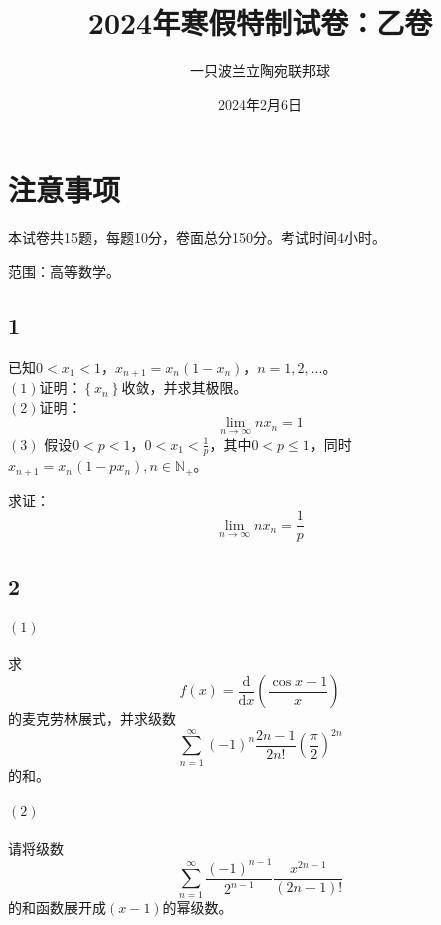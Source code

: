 \documentclass[a4paper,12pt]{article}
\title{2024年寒假特制试卷：乙卷}
\author{一只波兰立陶宛联邦球}
\date{2024年2月6日}
\begin{document}
\maketitle
\section*{注意事项}
本试卷共15题，每题10分，卷面总分150分。考试时间4小时。

范围：高等数学。
\subsection*{1}\noindent 已知$0<x_{1}<1$，$x_{n+1}=x_{n}\left(1-x_{n}\right)$，$n=1,2,\dots$。\\
\noindent $\left(1\right)$证明：$\left\{x_{n}\right\}$收敛，并求其极限。\\
\noindent $\left(2\right)$证明：\begin{equation*}
	\lim\limits_{n\rightarrow\infty}nx_{n}=1
\end{equation*}
\noindent$\left(3\right)$
假设$0<p<1$，$0<x_{1}<\frac{1}{p}$，其中$0<p\leq 1$，同时
$x_{n+1}=x_{n}\left(1-px_{n}\right), n\in\mathbb{N}_{+}$。

求证：
\begin{equation*}
	\lim\limits_{n\rightarrow\infty}nx_{n}=\frac{1}{p}
\end{equation*}
\subsection*{2}
\paragraph{$\left(1\right)$}\noindent 求
\begin{equation*}
	f(x)=\frac{\mathrm{d}}{\mathrm{d}x}\left(\frac{\cos x-1}{x}\right)
\end{equation*}的麦克劳林展式，并求级数
\begin{equation*}
\sum_{n=1}^{\infty}\left(-1\right)^n\frac{2n-1}{2n!}\left(\frac{\pi}{2}\right)^{2n}
\end{equation*}
的和。
\paragraph{$\left(2\right)$}\noindent 请将级数\begin{equation*}
	\sum_{n=1}^{\infty}\frac{\left(-1\right)^{n-1}}{2^{n-1}}\frac{x^{2n-1}}{\left(2n-1\right)!}
\end{equation*}的和函数展开成$\left(x-1\right)$的幂级数。
\end{document}
